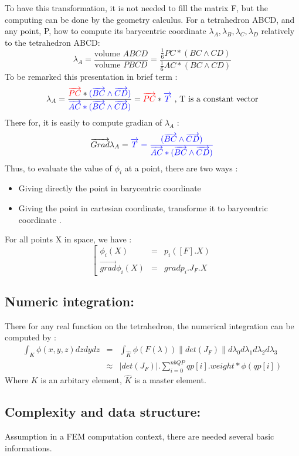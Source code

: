 \documentclass[a4paper,10pt]{article}
\begin{document}
To have this transformation, it is not needed to fill the matrix F, but the computing can be done by the geometry calculus. For a tetrahedron ABCD, and any point, P, how to compute its barycentric coordinate {$\lambda_A, \lambda_B, \lambda_C, \lambda_D $} relatively to the tetrahedron ABCD:
 \[
\lambda_A=\frac{ \text{volume }ABCD }{ \text{volume }PBCD } =\frac{\frac{1}{6} PC* (BC \wedge CD) }{\frac{1}{6} AC* (BC \wedge CD) }
\]
To be remarked this presentation in brief term : 
 \[
\lambda_A=\frac{{\color{red}\overrightarrow{PC}} * {\color{blue}(\overrightarrow{BC} \wedge \overrightarrow{CD})} }{ {\color{blue}\overrightarrow{AC}*(\overrightarrow{BC} \wedge \overrightarrow{CD})} }={\color{red}\overrightarrow{PC}}*{\color{blue}\overrightarrow{T}}  \text{ , T is a constant vector}
\]
There for, it is easily to compute gradian of $\lambda_A$ : 
 \[
\overrightarrow{Grad} \lambda_A=\color{blue} \overrightarrow{T} =\frac{(\overrightarrow{BC} \wedge \overrightarrow{CD})}{\overrightarrow{AC}*(\overrightarrow{BC} \wedge \overrightarrow{CD})}
\]
Thus, to evaluate the value of $\phi_i$ at a point, there are two ways : 
\begin{itemize}
\item Giving directly the point in barycentric coordinate 
\item Giving the point in cartesian coordinate, transforme it to barycentric coordinate . 
\end{itemize}
For all points X in space, we have :
 \[
\left[
\begin{array}{rcl}
\phi_i(X) &=& p_i(\left[F\right].X)  \\
\overrightarrow{grad}\phi_i(X)&=& gradp_i .J_F.X 
\end{array}
\right.
\]
\subsection{Numeric integration: }
There for any real function on the tetrahedron, the numerical integration can be computed by :
 \[
\begin{array}{rcl}
\int_{K}\phi(x,y,z)dzdydz & = & \int_{\hat{K}}\phi(F(\lambda)) \parallel det(J_F) \parallel d\lambda_0d\lambda_1d\lambda_2d\lambda_3 \\
 &  \approx & \left| det(J_F) \right| . \sum_{i=0}^{nbQP} qp[i].weight* \phi (qp[i])
\end{array}
\]
Where $K$ is an arbitary element, $\hat{K}$ is a master element.
\subsection{Complexity and data structure: }
Assumption in a FEM computation context, there are needed several basic informations. 
\end{document}
